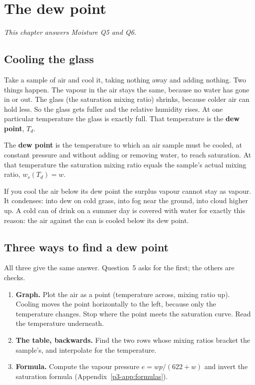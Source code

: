 \chapter{The dew point}\label{p3-ch:dew}

\textit{This chapter answers Moisture Q5 and Q6.}

\section{Cooling the glass}

Take a sample of air and cool it, taking nothing away and adding nothing. Two things happen. The vapour in the air stays the same, because no water has gone in or out. The glass (the saturation mixing ratio) shrinks, because colder air can hold less. So the glass gets fuller and the relative humidity rises. At one particular temperature the glass is exactly full. That temperature is the \textbf{dew point}, $T_d$.

\begin{keybox}[Definition]
The \textbf{dew point} is the temperature to which an air sample must be cooled, at constant pressure and without adding or removing water, to reach saturation. At that temperature the saturation mixing ratio equals the sample's actual mixing ratio, $w_s(T_d)=w$.
\end{keybox}

If you cool the air below its dew point the surplus vapour cannot stay as vapour. It condenses: into dew on cold grass, into fog near the ground, into cloud higher up. A cold can of drink on a summer day is covered with water for exactly this reason: the air against the can is cooled below its dew point.

\section{Three ways to find a dew point}

All three give the same answer. Question~5 asks for the first; the others are checks.

\begin{enumerate}[label=\textbf{Method \Alph*.},leftmargin=*,itemsep=4pt]
\item \textbf{Graph.} Plot the air as a point (temperature across, mixing ratio up). Cooling moves the point horizontally to the left, because only the temperature changes. Stop where the point meets the saturation curve. Read the temperature underneath.
\item \textbf{The table, backwards.} Find the two rows whose mixing ratios bracket the sample's, and interpolate for the temperature.
\item \textbf{Formula.} Compute the vapour pressure $e=wp/(622+w)$ and invert the saturation formula (Appendix~\ref{p3-app:formulas}).
\end{enumerate}

